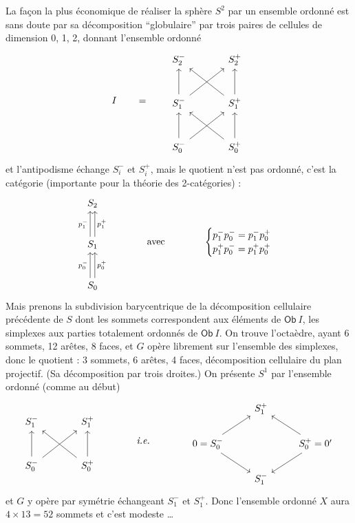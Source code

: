 \documentclass[11pt,leqno]{article}
\newcommand{\msp}[1]{\marginpar{\footnotesize [#1]}}
\begin{document}
La façon la plus économique de réaliser la sphère $S^2$ par un ensemble ordonné est sans doute par sa décomposition ``globulaire'' par trois paires de cellules de dimension 0, 1, 2, donnant l'ensemble ordonné
\[
I \qquad = \qquad
\begin{tikzcd}[row sep=large, column sep=large]
S_2^- & S_2^+ \\
S_1^- \arrow[u] \arrow[ur] & S_1^+ \arrow[u] \arrow[ul] \\
S_0^- \arrow[u] \arrow[ur] & S_0^+ \arrow[u] \arrow[ul]
\end{tikzcd}
\]
et l'antipodisme échange $S_i^-$ et $S_i^+$, mais le quotient n'est pas ordonné, c'est la catégorie (importante pour la théorie des 2-catégories) :
\msp{page 95}
\[
\begin{tikzcd}[row sep=large]
S_2 \\
S_1 \arrow[u, shift left, "p_1^-"] \arrow[u, shift right, "p_1^+"'] \\
S_0 \arrow[u, shift left, "p_0^-"] \arrow[u, shift right, "p_0^+"']
\end{tikzcd}
\qquad\qquad \text{avec} \qquad\qquad
\begin{cases}
p_1^- p_0^- = p_1^- p_0^+ \\
p_1^+ p_0^- = p_1^+ p_0^+
\end{cases}
\]
Mais prenons la subdivision barycentrique de la décomposition cellulaire précédente de $S$ dont les sommets correspondent aux éléments de $\mathsf{Ob}\ I$, les simplexes aux parties totalement ordonnés de $\mathsf{Ob}\ I$. On trouve l'octaèdre, ayant 6 sommets, 12 arêtes, 8 faces, et $G$ opère librement sur l'ensemble des simplexes, donc le quotient : 3 sommets, 6 arêtes, 4 faces, décomposition cellulaire du plan projectif. (Sa décomposition par trois droites.) On présente $S^1$ par l'ensemble ordonné (comme au début) %
\[
\begin{tikzcd}[row sep=large, column sep=large]
S_1^- & S_1^+ \\
S_0^- \arrow[u] \arrow[ur] & S_0^+ \arrow[u] \arrow[ul]
\end{tikzcd}
\qquad\qquad \textit{i.e.} \qquad\qquad
\begin{tikzcd}
 & S_1^+ & \\
0 = S_0^- \arrow[ur] \arrow[dr] & & S_0^+ = 0' \arrow[ul] \arrow[dl] \\
 & S_1^- &
\end{tikzcd}
\]
et $G$ y opère par symétrie échangeant $S_1^-$ et $S_1^+$. Donc l'ensemble ordonné $X$ aura $4 \times 13 = 52$ sommets et c'est modeste \ldots
\end{document}
